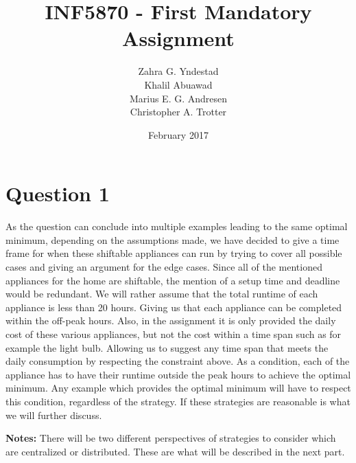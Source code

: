 \documentclass{article}
\title{INF5870 - First Mandatory Assignment}
\author{Zahra G. Yndestad \\ Khalil Abuawad \\ Marius E. G. Andresen \\ Christopher A. Trotter}
\date{February 2017}
\begin{document}
\maketitle

\section{Question 1}
	As the question can conclude into multiple examples leading to the same optimal minimum, depending on the assumptions made, we have decided to give a time frame for when these shiftable appliances can run by trying to cover all possible cases and giving an argument for the edge cases. Since all of the mentioned appliances for the home are shiftable, the mention of a setup time and deadline would be redundant. We will rather assume that the total runtime of each appliance is less than 20 hours. Giving us that each appliance can be completed within the off-peak hours. Also, in the assignment it is only provided the daily cost of these various appliances, but not the cost within a time span such as for example the light bulb. Allowing us to suggest any time span that meets the daily consumption by respecting the constraint above.  As a condition, each of the appliance has to have their runtime outside the peak hours to achieve the optimal minimum. Any example which provides the optimal minimum will have to respect this condition, regardless of the strategy. If these strategies are reasonable is what we will further discuss.

    \textbf{Notes:} There will be two different perspectives of strategies to consider which are centralized or distributed. These are what will be described in the next part.
\end{document}
